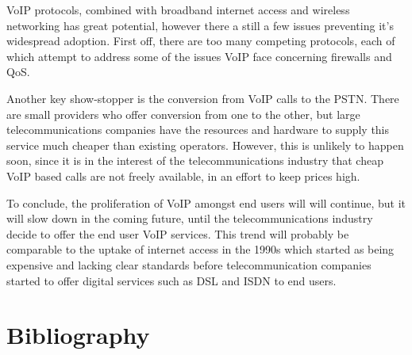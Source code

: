 \documentclass[a4paper,12pt]{article}
\begin{document}
VoIP protocols, combined with broadband internet access and wireless
networking has great potential, however there a still a few issues
preventing it's widespread adoption. First off, there are too many
competing protocols, each of which attempt to address some of the
issues VoIP face concerning firewalls and QoS.


Another key show-stopper is the conversion from VoIP calls to the PSTN.
There are small providers who offer conversion from one to the other,
but large telecommunications companies have the resources and hardware
to supply this service much cheaper than existing operators. However,
this is unlikely to happen soon, since it is in the interest of the
telecommunications industry that cheap VoIP based calls are not freely
available, in an effort to keep prices high.


To conclude, the proliferation of VoIP amongst end users will will
continue, but it will slow down in the coming future, until the 
telecommunications industry decide to offer the end user VoIP 
services. This trend will probably be comparable to the uptake of
internet access in the 1990s which started as being expensive and
lacking clear standards before telecommunication companies started to
offer digital services such as DSL and ISDN to end users. 

\section{Bibliography}




\end{document}
